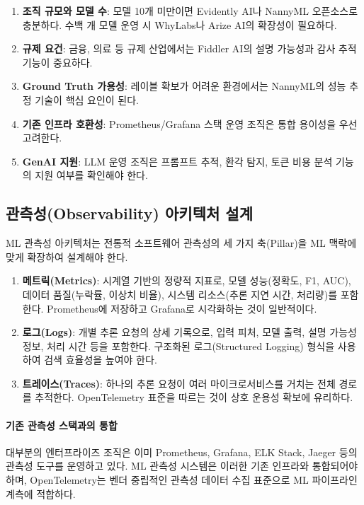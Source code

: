 \begin{enumerate}
    \item \textbf{조직 규모와 모델 수}: 모델 10개 미만이면 Evidently AI나 NannyML 오픈소스로 충분하다. 수백 개 모델 운영 시 WhyLabs나 Arize AI의 확장성이 필요하다.
    \item \textbf{규제 요건}: 금융, 의료 등 규제 산업에서는 Fiddler AI의 설명 가능성과 감사 추적 기능이 중요하다.
    \item \textbf{Ground Truth 가용성}: 레이블 확보가 어려운 환경에서는 NannyML의 성능 추정 기술이 핵심 요인이 된다.
    \item \textbf{기존 인프라 호환성}: Prometheus/Grafana 스택 운영 조직은 통합 용이성을 우선 고려한다.
    \item \textbf{GenAI 지원}: LLM 운영 조직은 프롬프트 추적, 환각 탐지, 토큰 비용 분석 기능의 지원 여부를 확인해야 한다.
\end{enumerate}

\subsection{관측성(Observability) 아키텍처 설계}
\label{sec:14.3.3}

ML 관측성 아키텍처는 전통적 소프트웨어 관측성의 세 가지 축(Pillar)을 ML 맥락에 맞게 확장하여 설계해야 한다\cite{kreuzberger2023machine}.

\begin{enumerate}
    \item \textbf{메트릭(Metrics)}: 시계열 기반의 정량적 지표로, 모델 성능(정확도, F1, AUC), 데이터 품질(누락률, 이상치 비율), 시스템 리소스(추론 지연 시간, 처리량)를 포함한다. Prometheus에 저장하고 Grafana로 시각화하는 것이 일반적이다.
    \item \textbf{로그(Logs)}: 개별 추론 요청의 상세 기록으로, 입력 피처, 모델 출력, 설명 가능성 정보, 처리 시간 등을 포함한다. 구조화된 로그(Structured Logging) 형식을 사용하여 검색 효율성을 높여야 한다.
    \item \textbf{트레이스(Traces)}: 하나의 추론 요청이 여러 마이크로서비스를 거치는 전체 경로를 추적한다. OpenTelemetry 표준을 따르는 것이 상호 운용성 확보에 유리하다.
\end{enumerate}

\paragraph{기존 관측성 스택과의 통합}

대부분의 엔터프라이즈 조직은 이미 Prometheus, Grafana, ELK Stack, Jaeger 등의 관측성 도구를 운영하고 있다. ML 관측성 시스템은 이러한 기존 인프라와 통합되어야 하며, OpenTelemetry는 벤더 중립적인 관측성 데이터 수집 표준으로 ML 파이프라인 계측에 적합하다.

